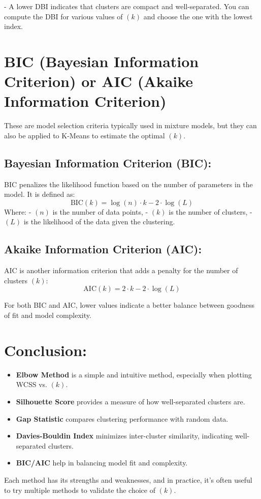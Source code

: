 \documentclass{article}
\begin{document}
- A lower DBI indicates that clusters are compact and well-separated. You can compute the DBI for various values of $( k )$ and choose the one with the lowest index.

\section*{BIC (Bayesian Information Criterion) or AIC (Akaike Information Criterion)}

These are model selection criteria typically used in mixture models, but they can also be applied to K-Means to estimate the optimal $( k )$.

\subsection*{ Bayesian Information Criterion (BIC):}
BIC penalizes the likelihood function based on the number of parameters in the model. It is defined as:
$$
\text{BIC}(k) = \log(n) \cdot k - 2 \cdot \log(L)
$$
Where:
- $( n )$ is the number of data points,
- $( k )$ is the number of clusters,
- $( L )$ is the likelihood of the data given the clustering.

\subsection{ Akaike Information Criterion (AIC):}
AIC is another information criterion that adds a penalty for the number of clusters $( k )$:
$$
\text{AIC}(k) = 2 \cdot k - 2 \cdot \log(L)
$$

For both BIC and AIC, lower values indicate a better balance between goodness of fit and model complexity.

\section*{ Conclusion:}
\begin{itemize}
    \item \textbf{Elbow Method} is a simple and intuitive method, especially when plotting WCSS vs. $( k )$.
    \item \textbf{Silhouette Score} provides a measure of how well-separated clusters are.
    \item \textbf{Gap Statistic} compares clustering performance with random data.
    \item \textbf{Davies-Bouldin Index} minimizes inter-cluster similarity, indicating well-separated clusters.
    \item \textbf{BIC/AIC} help in balancing model fit and complexity.
\end{itemize}

Each method has its strengths and weaknesses, and in practice, it's often useful to try multiple methods to validate the choice of $( k )$.
\end{document}
